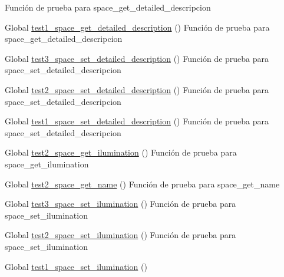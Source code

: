 \begin{DoxyRefList}
%
Función de prueba para space\+\_\+get\+\_\+detailed\+\_\+descripcion  
\item[Global \mbox{\hyperlink{space__test_8c_ab00e408d268230a4ebfa789ce2fba104}{test1\+\_\+space\+\_\+get\+\_\+detailed\+\_\+description}} ()]\label{test__test000295}%
%
Función de prueba para space\+\_\+get\+\_\+detailed\+\_\+descripcion  
\item[Global \mbox{\hyperlink{space__test_8c_a9bd3ad5b0c9b3e4a339fb1b0ff932ed2}{test3\+\_\+space\+\_\+set\+\_\+detailed\+\_\+description}} ()]\label{test__test000294}%
%
Función de prueba para space\+\_\+set\+\_\+detailed\+\_\+descripcion  
\item[Global \mbox{\hyperlink{space__test_8c_a4a5d16476783f31bda040a95fe0cf825}{test2\+\_\+space\+\_\+set\+\_\+detailed\+\_\+description}} ()]\label{test__test000293}%
%
Función de prueba para space\+\_\+set\+\_\+detailed\+\_\+descripcion  
\item[Global \mbox{\hyperlink{space__test_8c_a0a3024e47d0354245b76a9728730a998}{test1\+\_\+space\+\_\+set\+\_\+detailed\+\_\+description}} ()]\label{test__test000292}%
%
Función de prueba para space\+\_\+set\+\_\+detailed\+\_\+descripcion  
\item[Global \mbox{\hyperlink{space__test_8c_a53dfd88fd3b4ee6cf54e25b3d0aa7d1f}{test2\+\_\+space\+\_\+get\+\_\+ilumination}} ()]\label{test__test000291}%
%
Función de prueba para space\+\_\+get\+\_\+ilumination  
\item[Global \mbox{\hyperlink{space__test_8c_aee88ed31c63efc674051a4563aed86e2}{test2\+\_\+space\+\_\+get\+\_\+name}} ()]\label{test__test000262}%
%
Función de prueba para space\+\_\+get\+\_\+name  
\item[Global \mbox{\hyperlink{space__test_8c_a89b87fffd76e94c927cc560096d07188}{test3\+\_\+space\+\_\+set\+\_\+ilumination}} ()]\label{test__test000289}%
%
Función de prueba para space\+\_\+set\+\_\+ilumination  
\item[Global \mbox{\hyperlink{space__test_8c_a02909acb073be05241f100e9b5fb2a54}{test2\+\_\+space\+\_\+set\+\_\+ilumination}} ()]\label{test__test000288}%
%
Función de prueba para space\+\_\+set\+\_\+ilumination  
\item[Global \mbox{\hyperlink{space__test_8c_ab39ef0dd4f72f7d274666b452830ad3d}{test1\+\_\+space\+\_\+set\+\_\+ilumination}} ()]\label{test__test000287}%

\end{DoxyRefList}

